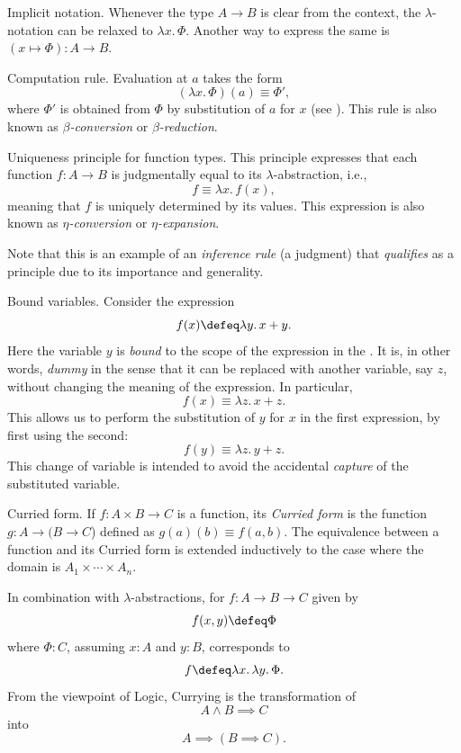 \begin{lpar}{Implicit notation.}
    Whenever the type $A\to B$ is clear from the context, the $\lambda$-notation can be relaxed to $\lambda x.\,\Phi$. Another way to express the same is $(x\mapsto\Phi)\colon A\to B$.
\end{lpar}

\begin{lpar}{Computation rule.}
    Evaluation at $a$ takes the form
    \[
        (\lambda x.\,\Phi)(a)\equiv\Phi',
    \]
    where $\Phi'$ is obtained from $\Phi$ by substitution of $a$ for $x$ (see ). This rule is also known as \textsl{$\beta$-conversion} or \textsl{$\beta$-reduction}.
\end{lpar}

\begin{lpar}{Uniqueness principle for function types.}\label{lpar:eta-expansion}
    This principle expresses that each function $f\colon A\to B$ is judgmentally equal to its $\lambda$-abstraction, i.e.,
    \[
        f\equiv\lambda x.\,f(x),
    \]
    meaning that $f$ is uniquely determined by its values. This expression is also known as \textsl{$\eta$-conversion} or \textsl{$\eta$-expansion}.

    Note that this is an example of an \textsl{inference rule} (a judgment) that \textit{qualifies} as a principle due to its importance and generality.
\end{lpar}

\begin{lpar}{Bound variables.}\label{lpar:bound-variables}
    Consider the expression
    \[
        f(x)\defeq\lambda y.\,x+y.
    \]
    Here the variable $y$ is \textsl{bound} to the scope of the expression in the \rhs. It is, in other words, \textsl{dummy} in the sense that it can be replaced with another variable, say $z$, without changing the meaning of the expression. In particular,
    \[
        f(x)\equiv\lambda z.\,x+z.
    \]
    This allows us to perform the substitution of $y$ for $x$ in the first expression, by first using the second:
    \[
        f(y)\equiv\lambda z.\,y+z.
    \]
    This change of variable is intended to avoid the accidental \textit{capture} of the substituted variable.
\end{lpar}

\begin{lpar}{Curried form.}\label{lpar:currying}
    If $f\colon A\times B\to C$ is a function, its \textsl{Curried form} is the function $g\colon A\to(B\to C$) defined as $g(a)(b)\equiv f(a,b)$. The equivalence between a function and its Curried form is extended inductively to the case where the domain is $A_1\times\cdots\times A_n$.

    In combination with $\lambda$-abstractions, for $f\colon A\to B\to C$ given by
    \[
        f(x, y) \defeq\Phi
    \]
    where $\Phi\colon C$, assuming $x\colon A$ and $y\colon B$, corresponds to
    \[
        f \defeq\lambda x.\,\lambda y.\,\Phi.
    \]
    From the viewpoint of Logic, Currying is the transformation of
    \[
        A\wedge B\implies C
    \]
    into
    \[
        A\implies(B\implies C).
    \]
\end{lpar}

